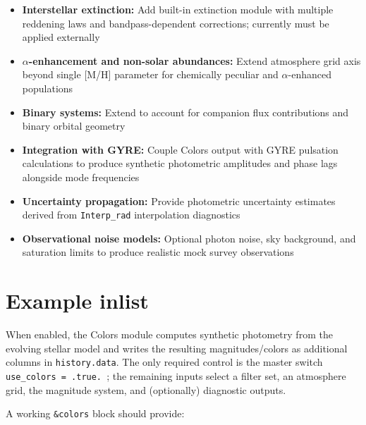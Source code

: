 \documentclass[linenumbers,apj,twocolumn, floatfix]{aastex701}
\begin{document}
\begin{itemize}
	\item \textbf{Interstellar extinction:}
	      Add built-in extinction module with multiple reddening laws and bandpass-dependent corrections; currently must be applied externally \item \textbf{$\alpha$-enhancement and non-solar abundances:} Extend atmosphere grid axis beyond single [M/H] parameter for chemically peculiar and $\alpha$-enhanced populations \item \textbf{Binary systems:} Extend to account for companion flux contributions and binary orbital geometry \item \textbf{Integration with GYRE:} Couple Colors output with GYRE pulsation calculations to produce synthetic photometric amplitudes and phase lags alongside mode frequencies \item \textbf{Uncertainty propagation:} Provide photometric uncertainty estimates derived from \texttt{Interp\_rad} interpolation diagnostics \item \textbf{Observational noise models:} Optional photon noise, sky background, and saturation limits to produce realistic mock survey observations \end{itemize} 

\appendix 

\section{Example inlist} \label{app:config} 

When enabled, the Colors module computes synthetic photometry from the evolving stellar model and writes the resulting magnitudes/colors as additional columns in \texttt{history.data}.
The only required control is the master switch \texttt{use\_colors = .true.
}; the remaining inputs select a filter set, an atmosphere grid, the magnitude system, and (optionally) diagnostic outputs.

A working \texttt{\&colors} block should provide: 
\end{document}
